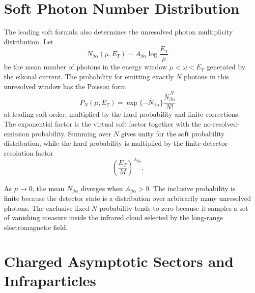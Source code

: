 \section{Soft Photon Number Distribution}

The leading soft formula also determines the unresolved photon multiplicity
distribution.  Let
\[
  \overline N_{\beta\alpha}(\mu,E_T)
  =
  A_{\beta\alpha}\log\frac{E_T}{\mu}
\]
be the mean number of photons in the energy window
\(\mu<\omega<E_T\) generated by the eikonal current.  The probability for
emitting exactly \(N\) photons in this unresolved window has the Poisson form
\[
  P_N(\mu,E_T)
  =
  \exp\{-\overline N_{\beta\alpha}\}
  \frac{\overline N_{\beta\alpha}^{\,N}}{N!}
\]
at leading soft order, multiplied by the hard probability and finite
corrections.  The exponential factor is the virtual soft factor together with
the no-resolved-emission probability.  Summing over \(N\) gives unity for the
soft probability distribution, while the hard probability is multiplied by the
finite detector-resolution factor
\[
  \left(\frac{E_T}{M}\right)^{A_{\beta\alpha}} .
\]

As \(\mu\to0\), the mean \(\overline N_{\beta\alpha}\) diverges when
\(A_{\beta\alpha}>0\).  The inclusive probability is finite because the
detector state is a distribution over arbitrarily many unresolved photons.
The exclusive fixed-\(N\) probability tends to zero because it samples a set
of vanishing measure inside the infrared cloud selected by the long-range
electromagnetic field.

\section{Charged Asymptotic Sectors and Infraparticles}

